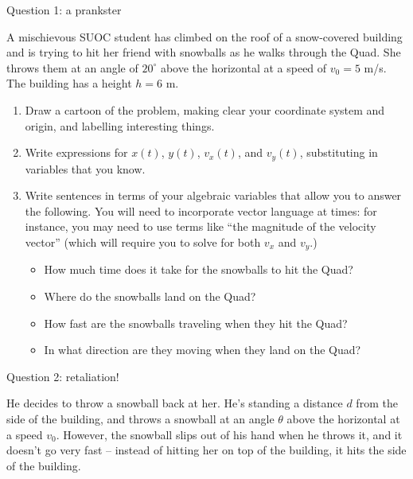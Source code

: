 \documentclass[12pt]{article}
\newcommand{\BI}{\begin{itemize}}
\newcommand{\EI}{\end{itemize}}
\begin{document}
\Large
\centerline{}
\normalsize
\centerline{}

\medskip

\centerline{\Large Question 1: a prankster}     

A mischievous SUOC student has climbed on the roof of a snow-covered building and is trying to hit her friend with snowballs as he walks through the Quad. She throws them at an angle of $20^\circ$ above the horizontal at a speed of $v_0=5$ m/s. 
The building has a height $h=6$ m.

\begin{enumerate}

\item Draw a cartoon of the problem, making clear your coordinate system and origin, and
labelling interesting things.

\vspace{4in}

\item Write expressions for $x(t)$, $y(t)$, $v_x(t)$, and $v_y(t)$, substituting in variables that you know.


\newpage
\item Write sentences in terms of your algebraic variables that allow you to answer the following. You  
will need to incorporate vector language at times: for instance, you may need to use terms like ``the magnitude of the
velocity vector'' (which will require you to solve for both $v_x$ and $v_y$.)

\BI
\item How much time does it take for the snowballs to hit the Quad?

\vspace{1.5in}

\item Where do the snowballs land on the Quad?

\vspace{1.5in}
\item How fast are the snowballs traveling when they hit the Quad?

\vspace{1.5in}
\item In what direction are they moving when they land on the Quad?
\EI
\end{enumerate}

\newpage

\centerline{\Large Question 2: retaliation!}     

He decides to throw a snowball back at her. He's standing a distance $d$ from the side of the building, and 
throws a snowball at an angle $\theta$ above the horizontal at a speed $v_0$. However, the snowball slips out of his hand when he throws it,
and it doesn't go very fast -- instead of hitting her on top of the building, it hits the side of the building.
\end{document}
